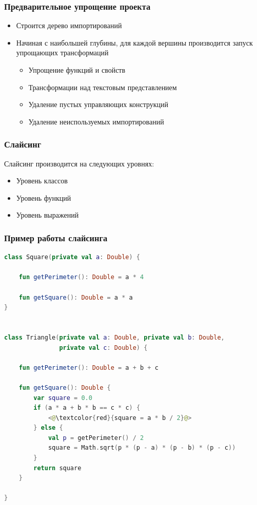 
\begin{frame}
	\frametitle{Предварительное упрощение проекта}
		\begin{itemize}
			\item Строится дерево импортирований
			\item Начиная с наибольшей глубины, для каждой вершины производится запуск упрощающих трансформаций
				\begin{itemize}
					\item Упрощение функций и свойств
					\item Трансформации над текстовым представлением
					\item Удаление пустых управляющих конструкций
					\item Удаление неиспользуемых импортирований
				\end{itemize}
		\end{itemize}			
\end{frame}


\begin{frame}
	\frametitle{Слайсинг}
		Слайсинг производится на следующих уровнях:
		\begin{itemize}
			\item Уровень классов
			\item Уровень функций
			\item Уровень выражений
		\end{itemize}
\end{frame}

\begin{frame}[fragile]
	\frametitle{Пример работы слайсинга}
	\tiny
	\begin{lstlisting}[language = Kotlin]
class Square(private val a: Double) {

    fun getPerimeter(): Double = a * 4

    fun getSquare(): Double = a * a
}


class Triangle(private val a: Double, private val b: Double, 
               private val c: Double) {

    fun getPerimeter(): Double = a + b + c

    fun getSquare(): Double {
        var square = 0.0
        if (a * a + b * b == c * c) {
            <@\textcolor{red}{square = a * b / 2}@>
        } else {
            val p = getPerimeter() / 2
            square = Math.sqrt(p * (p - a) * (p - b) * (p - c))
        }
        return square
    }

}
\end{lstlisting}
\end{frame}

